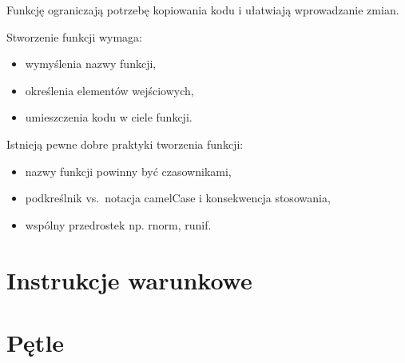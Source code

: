\documentclass[]{book}
\providecommand{\tightlist}{%
  \setlength{\itemsep}{0pt}\setlength{\parskip}{0pt}}
\begin{document}
Funkcję ograniczają potrzebę kopiowania kodu i ułatwiają wprowadzanie
zmian.

Stworzenie funkcji wymaga:

\begin{itemize}
\tightlist
\item
  wymyślenia nazwy funkcji,
\item
  określenia elementów wejściowych,
\item
  umieszczenia kodu w ciele funkcji.
\end{itemize}

Istnieją pewne dobre praktyki tworzenia funkcji:

\begin{itemize}
\tightlist
\item
  nazwy funkcji powinny być czasownikami,
\item
  podkreślnik vs.~notacja camelCase i konsekwencja stosowania,
\item
  wspólny przedrostek np. rnorm, runif.
\end{itemize}

\section{Instrukcje warunkowe}\label{instrukcje-warunkowe}

\section{Pętle}\label{petle}
\end{document}
